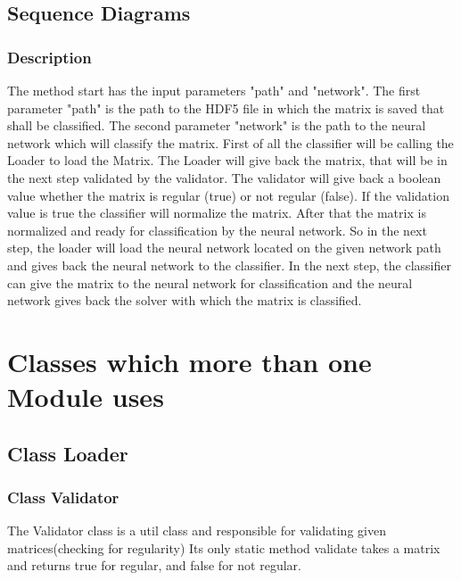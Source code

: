 \documentclass[parskip=full]{scrartcl}
\begin{document}
 
\newpage
\subsection{Sequence Diagrams} 

\begin{figure}[h]
\begin{center}

\label{Sequence Diagrams}
\end{center}
\end{figure}

\newpage
\subsubsection{Description}
The method start has the input parameters "path" and "network".
The first parameter "path" is the path to the HDF5 file in which the matrix is saved that shall be classified.
The second parameter "network" is the path to the neural network which will classify the matrix.
First of all the classifier will be calling the Loader to load the Matrix.
The Loader will give back the matrix, that will be in the next step validated by the validator. 
The validator will give back a boolean value whether the matrix is regular (true) or not regular (false).
If the validation value is true the classifier will normalize the matrix. 
After that the matrix is normalized and ready for classification by the neural network.
So in the next step, the loader will load the neural network located on the given network path and gives back the neural network to the classifier.
In the next step, the classifier can give the matrix to the neural network for classification and the neural network gives back the  solver with which the matrix is classified.


\newpage
\section{Classes which more than one Module uses}

\subsection{Class Loader}

\subsubsection{Class Validator}
The Validator class is a util class and responsible for validating given matrices(checking for regularity)
Its only static method validate takes a matrix and returns true for regular, and false for not regular.
\end{document}
